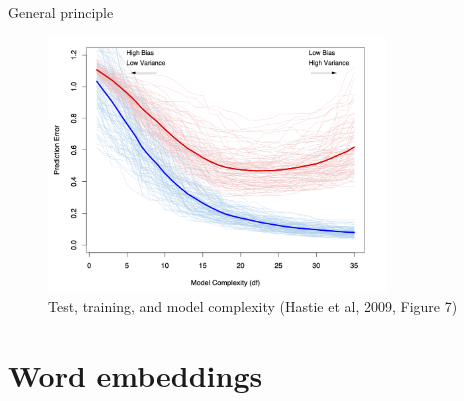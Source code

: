 \documentclass[10pt]{beamer}
\begin{document}
\begin{frame}{General principle}

\begin{figure}[h]
\caption{Test, training, and model complexity (Hastie et al, 2009, Figure 7)}
\centering
\includegraphics[width=0.8\textwidth]{fig/ESL_7_1.png}
\end{figure}



\end{frame}




\section{Word embeddings}
\end{document}
